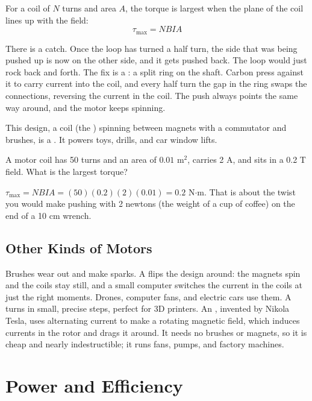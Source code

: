 For a coil of $N$ turns and area $A$, the torque is largest when the plane
of the coil lines up with the field:
$$\tau_{\max} = NBIA$$

There is a catch. Once the loop has turned a half turn, the side that was
being pushed up is now on the other side, and it gets pushed back. The loop
would just rock back and forth. The fix is a 
: a split ring on the shaft. Carbon 
press against it to carry current into the coil, and every half turn the
gap in the ring swaps the connections, reversing the current in the coil.
The push always points the same way around, and the motor keeps spinning.

This design, a coil (the ) spinning
between magnets with a commutator and brushes, is a . It powers toys, drills, and car window
lifts.

\begin{Worked}
\begin{Problem}
A motor coil has 50 turns and an area of
$0.01$ m$^2$, carries 2 A, and sits in a 0.2 T field. What is the largest
torque?
\end{Problem}
\begin{Solution}
$\tau_{\max} = NBIA = (50)(0.2)(2)(0.01) = 0.2$ N$\cdot$m.
That is about the twist you would make pushing with 2 newtons (the weight
of a cup of coffee) on the end of a 10 cm wrench.
\end{Solution}
\end{Worked}

\subsection{Other Kinds of Motors}
Brushes wear out and make sparks. A  flips the
design around: the magnets spin and the coils stay still, and a small
computer switches the current in the coils at just the right moments.
Drones, computer fans, and electric cars use them. A  turns in small, precise steps, perfect for 3D printers. An
, invented by Nikola Tesla, uses alternating
current to make a rotating magnetic field, which induces currents in the
rotor and drags it around. It needs no brushes or magnets, so it is cheap
and nearly indestructible; it runs fans, pumps, and factory machines.

\section{Power and Efficiency}

